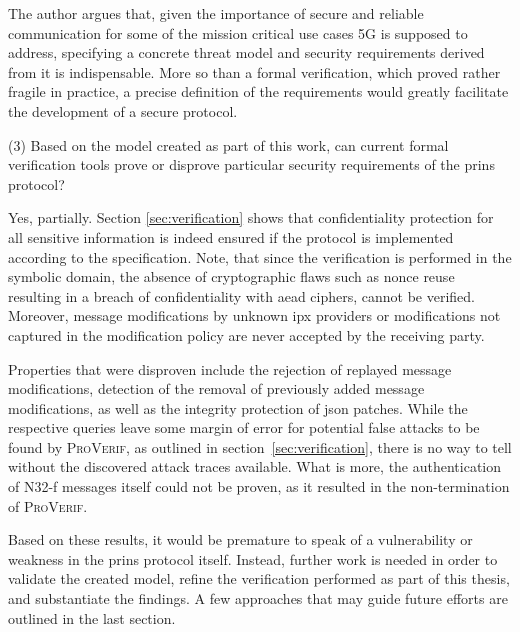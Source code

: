 The author argues that, given the importance of secure and reliable communication for some of the mission critical use cases 5G is supposed to address, specifying a concrete threat model and security requirements derived from it is indispensable.
More so than a formal verification, which proved rather fragile in practice, a precise definition of the requirements would greatly facilitate the development of a secure protocol.\bigskip

\noindent
(3) Based on the model created as part of this work, can current formal verification tools prove or disprove particular security requirements of the \gls{prins} protocol?

Yes, partially.
Section \ref{sec:verification} shows that confidentiality protection for all sensitive information is indeed ensured if the protocol is implemented according to the specification.
Note, that since the verification is performed in the symbolic domain, the absence of cryptographic flaws such as nonce reuse resulting in a breach of confidentiality with \gls{aead} ciphers, cannot be verified.
Moreover, message modifications by unknown \gls{ipx} providers or modifications not captured in the modification policy are never accepted by the receiving party.

Properties that were disproven include the rejection of replayed message modifications, detection of the removal of previously added message modifications, as well as the integrity protection of \gls{json} patches.
While the respective queries leave some margin of error for potential false attacks to be found by \textsc{ProVerif}, as outlined in section~\ref{sec:verification}, there is no way to tell without the discovered attack traces available.
What is more, the authentication of N32-f messages itself could not be proven, as it resulted in the non-termination of \textsc{ProVerif}.

Based on these results, it would be premature to speak of a vulnerability or weakness in the \gls{prins} protocol itself.
Instead, further work is needed in order to validate the created model, refine the verification performed as part of this thesis, and substantiate the findings.
A few approaches that may guide future efforts are outlined in the last section.